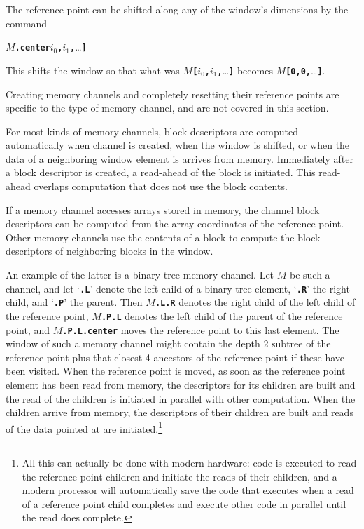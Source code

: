 \documentclass[12pt]{article}
\makeatletter
\newcommand{\TT}[1]{{\tt \bfseries #1}}
\newcommand{\ttdkey}[1]{\TT{.#1}\index{#1@{\tt .#1}}}
\makeatother
\begin{document}
The reference point can be shifted along any of the window's
dimensions by the command
\begin{center}
$M$\ttdkey{center}\TT{[}$i_0$\TT{,}$i_1$\TT{,}\ldots\TT{]}
\end{center}
This shifts
the window so that what was
$M$\TT{[}$i_0$\TT{,}$i_1$\TT{,}\ldots\TT{]} becomes
$M$\TT{[0,0,}\ldots\TT{]}.

Creating memory channels and completely resetting their reference points
are specific to the type of memory channel, and are not covered in
this section.

For most kinds of memory channels, block descriptors are computed
automatically when channel is created, when the window is
shifted, or when the data of
a neighboring window element is arrives from memory.
Immediately after a block descriptor is created, a read-ahead of
the block is initiated.  This read-ahead overlaps computation that
does not use the block contents.

If a memory channel accesses arrays stored in memory,
the channel block descriptors can be computed from the array coordinates
of the reference point.  Other memory channels use the contents
of a block to compute the block descriptors of neighboring blocks
in the window.

An example of the latter is a binary tree memory channel.
Let $M$ be such a channel, and let `\TT{.L}' denote the left
child of a binary tree element, `\TT{.R}' the right child, and
`\TT{.P}' the parent.  Then $M\!$\TT{.L.R} denotes the right
child of the left child of the reference point, $M\!$\TT{.P.L}
denotes the left child of the parent of the reference point,
and $M\!$\TT{.P.L.center} moves the reference point to this last element.
The window of such a memory channel might contain the depth 2
subtree of the reference point plus that closest 4 ancestors of the
reference point if these have been visited.  When the reference
point is moved, as soon as the reference point element has been
read from memory, the descriptors for its children are built and
the read of the children is initiated in parallel with other
computation.  When the children arrive from memory, the descriptors
of their children are built and reads of the data pointed at
are initiated.\footnote{All this can actually be done with modern
hardware: code is executed to read the reference point children and initiate the
reads of their children, and a modern processor will automatically
save the code that
executes when a read of a reference point child completes and execute
other code in parallel until the read does complete.}
\end{document}
